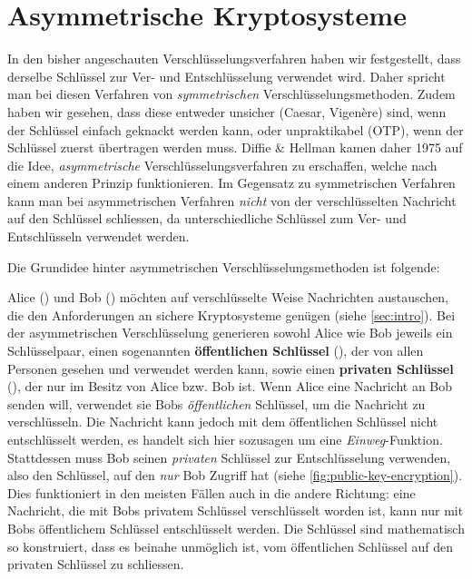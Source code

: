 \chapter{Asymmetrische Kryptosysteme}\label{chap:asymmetrische-kryptosysteme}

In den bisher angeschauten Verschlüsselungsverfahren haben wir festgestellt, dass derselbe Schlüssel zur Ver- und Entschlüsselung verwendet wird. Daher spricht man bei diesen Verfahren von \emph{symmetrischen} Verschlüsselungsmethoden. Zudem haben wir gesehen, dass diese entweder unsicher (Caesar, Vigenère) sind, wenn der Schlüssel einfach geknackt werden kann, oder unpraktikabel (\gls{OTP}), wenn der Schlüssel zuerst übertragen werden muss. Diffie \& Hellman kamen daher 1975 auf die Idee, \emph{asymmetrische} Verschlüsselungsverfahren zu erschaffen, welche nach einem anderen Prinzip funktionieren. Im Gegensatz zu symmetrischen Verfahren kann man bei asymmetrischen Verfahren \emph{nicht} von der verschlüsselten Nachricht auf den Schlüssel schliessen, da unterschiedliche Schlüssel zum Ver- und Entschlüsseln verwendet werden.

Die Grundidee hinter asymmetrischen Verschlüsselungsmethoden ist folgende:

Alice () und Bob () möchten auf verschlüsselte Weise Nachrichten austauschen, die den Anforderungen an sichere Kryptosysteme genügen (siehe \cref{sec:intro}). Bei der asymmetrischen Verschlüsselung generieren sowohl Alice wie Bob jeweils ein Schlüsselpaar, einen sogenannten \textbf{öffentlichen Schlüssel} (), der von allen Personen gesehen und verwendet werden kann, sowie einen \textbf{privaten Schlüssel} (), der nur im Besitz von Alice bzw. Bob ist. Wenn Alice eine Nachricht an Bob senden will, verwendet sie Bobs \emph{öffentlichen} Schlüssel, um die Nachricht zu verschlüsseln. Die Nachricht kann jedoch mit dem öffentlichen Schlüssel nicht entschlüsselt werden, es handelt sich hier sozusagen um eine \emph{Einweg}-Funktion. Stattdessen muss Bob seinen \emph{privaten} Schlüssel zur Entschlüsselung verwenden, also den Schlüssel, auf den \emph{nur} Bob Zugriff hat (siehe \cref{fig:public-key-encryption}). Dies funktioniert in den meisten Fällen auch in die andere Richtung: eine Nachricht, die mit Bobs privatem Schlüssel verschlüsselt worden ist, kann nur mit Bobs öffentlichem Schlüssel entschlüsselt werden. Die Schlüssel sind mathematisch so konstruiert, dass es beinahe unmöglich ist, vom öffentlichen Schlüssel auf den privaten Schlüssel zu schliessen.


